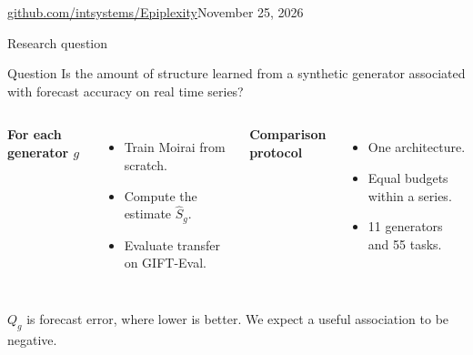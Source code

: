 \documentclass[aspectratio=169,11pt]{beamer}
\newcommand{\smallnote}[1]{{\scriptsize\color{gray}#1\par}}
\begin{document}
\begin{frame}[plain]
\vspace{6mm}{\huge\bfseries episynth\par}\vspace{2mm}{\LARGE Proof of Concept\par}
\vspace{4mm}{\large Three estimators for synthetic time series\\Coding cost, context gain, and transfer\par}
\vspace{6mm}{\small Alexey Kravatskiy · Mark Ikonnikov\\Daniil Kazachkov · Danila Chernousov\par}
\vspace{5mm}\href{https://github.com/intsystems/Epiplexity}{\color{Teal}\small github.com/intsystems/Epiplexity}\hfill{\small November 25, 2026}
\end{frame}

\begin{frame}{Research question}
\begin{block}{Question}
Is the amount of structure learned from a synthetic generator associated with forecast accuracy on real time series?
\end{block}\vspace{2mm}
\begin{columns}[T]
\textbf{For each generator \(g\)}
\begin{itemize}\item Train Moirai from scratch.\item Compute the estimate \(\widehat S_g\).\item Evaluate transfer on GIFT-Eval.\end{itemize}
\textbf{Comparison protocol}
\begin{itemize}\item One architecture.\item Equal budgets within a series.\item 11 generators and 55 tasks.\end{itemize}
\end{columns}\vspace{2mm}
\par{}\par\vspace{1mm}
\smallnote{\(Q_g\) is forecast error, where lower is better. We expect a useful association to be negative.}
\end{frame}
\end{document}
